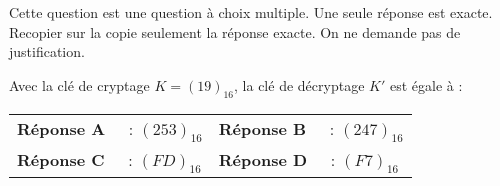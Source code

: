 \documentclass[a4paper,10pt]{book}
\begin{document}
\begin{enumerate}[\bfseries 1.]
	\smallskip

	Cette question est une question à choix multiple. Une seule réponse est exacte. Recopier sur la
	copie seulement la réponse exacte. On ne demande pas de justification.

	\smallskip

	Avec la clé de cryptage $K = (19)_{16}$, la clé de décryptage $K'$ est égale à :

	\begin{center}
		\begin{tabularx}{0.75\linewidth}{X X}
			\textbf{Réponse A~~} : $(253)_{16}$	&\textbf{Réponse B~~} : $(247)_{16}$\\
			\textbf{Réponse C~~} : $(FD)_{16}$ 	&\textbf{Réponse D~~} : $(F7)_{16}$\\
		\end{tabularx}
	\end{center}
\end{enumerate}
\end{document}
